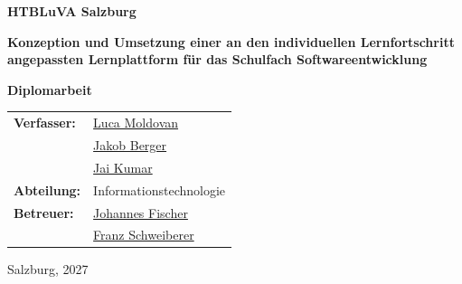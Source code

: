 \thispagestyle{empty}
\begin{titlepage}
	\centering

	{\Large\textbf{HTBLuVA Salzburg}\par}
	\vspace{1.5cm}

	\vfill

	{\parbox{0.9\textwidth}{\centering
		\Huge\textbf{Konzeption und Umsetzung einer an den individuellen Lernfortschritt
		angepassten Lernplattform für das Schulfach Softwareentwicklung}\par}}
	\vspace{1.2cm}

	{\Large\textbf{Diplomarbeit}\par}
	\vspace{1cm}

	\renewcommand{\arraystretch}{1.3}
	\begin{tabular}{@{}ll@{}}
		\textbf{Verfasser:} & \hyperref[tab:ersteller]{Luca Moldovan} \\
		                     & \hyperref[tab:ersteller]{Jakob Berger} \\
		                     & \hyperref[tab:ersteller]{Jai Kumar} \\
		\textbf{Abteilung:} & Informationstechnologie \\
		\textbf{Betreuer:} & \hyperref[tab:betreuer]{Johannes Fischer} \\
                            & \hyperref[tab:betreuer]{Franz Schweiberer} \\
	\end{tabular}

	\vfill

	{\large Salzburg, 2027\par}
\end{titlepage}
